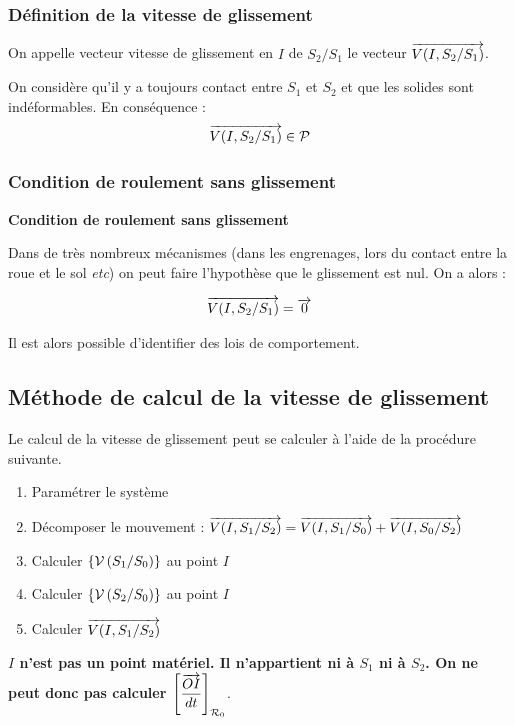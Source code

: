 \documentclass[10pt,oneside]{article}
\begin{document}
\subsubsection{Définition de la vitesse de glissement}
On appelle vecteur vitesse de glissement en $I$ de $S_2/S_1$ le vecteur $\overrightarrow{V(I,S_2/S_1)}$.

\begin{rem}
On considère qu'il y a toujours contact entre $S_1$ et $S_2$ et que les solides sont indéformables. En conséquence :
$$\overrightarrow{V(I,S_2/S_1)} \in \mathcal{P}$$
\end{rem}

\subsubsection{Condition de roulement sans glissement}
\begin{defi}
\textbf{Condition de roulement sans glissement}

Dans de très nombreux mécanismes (dans les engrenages, lors du contact entre la roue et le sol \textit{etc}) on peut faire l'hypothèse que le glissement est nul. On a alors : 

$$
\overrightarrow{V(I,S_2/S_1)} = \overrightarrow{0}
$$
\end{defi}


Il est alors possible d'identifier des lois de comportement.
\subsection{Méthode de calcul de la vitesse de glissement}
Le calcul de la vitesse de glissement peut se calculer à l'aide de la procédure suivante.

\begin{methode}
\begin{enumerate}
\item Paramétrer le système
\item Décomposer le mouvement : $\overrightarrow{V(I,S_1/S_2)}=\overrightarrow{V(I,S_1/S_0)}+\overrightarrow{V(I,S_0/S_2)}$
\item Calculer $\left\{\mathcal{V} \left(S_1/S_0 \right) \right\}$ au point $I$
\item Calculer $\left\{\mathcal{V} \left(S_2/S_0 \right) \right\}$ au point $I$
\item Calculer  $\overrightarrow{V(I,S_1/S_2)}$
\end{enumerate}
\end{methode}

\begin{warn}
\textbf{$I$ n'est pas un point matériel. Il n'appartient ni à $S_1$ ni à $S_2$. On ne peut donc pas calculer $\left[\dfrac{\overrightarrow{OI}}{dt}\right]_{\mathcal{R}_0}$}.
\end{warn}
\end{document}
